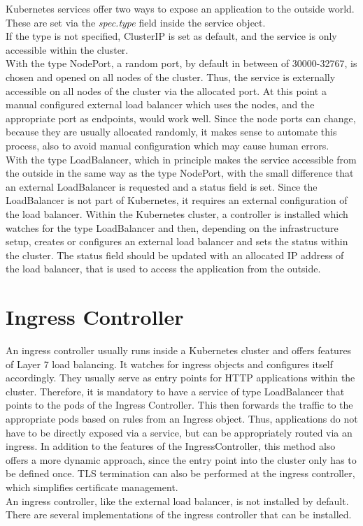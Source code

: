 Kubernetes services offer two ways to expose an application to the outside world.
These are set via the \textit{spec.type} field inside the service object.
\\
If the type is not specified, ClusterIP is set as default, and the service is only accessible within the cluster.
\\
With the type NodePort, a random port, by default in between of 30000-32767, is chosen and opened on all nodes of the cluster.
Thus, the service is externally accessible on all nodes of the cluster via the allocated port.
At this point a manual configured external load balancer which uses the nodes, and the appropriate port as endpoints, would work well.
Since the node ports can change, because they are usually allocated randomly, it makes sense to automate this process, also to avoid manual configuration which may cause human errors.
\\
With the type LoadBalancer, which in principle makes the service accessible from the outside in the same way as the type NodePort, with the small difference that an external LoadBalancer is requested and a status field is set.
Since the LoadBalancer is not part of Kubernetes, it requires an external configuration of the load balancer.
Within the Kubernetes cluster, a controller is installed which watches for the type LoadBalancer and then, depending on the infrastructure setup, creates or configures an external load balancer and sets the status within the cluster.
The status field should be updated with an allocated IP address of the load balancer, that is used to access the application from the outside.~\cite{KUBERNETES-SERVICE}

\section{Ingress Controller}\label{sec:IngressController}

An ingress controller usually runs inside a Kubernetes cluster and offers features of Layer 7 load balancing.
It watches for ingress objects and configures itself accordingly.
They usually serve as entry points for HTTP applications within the cluster.
Therefore, it is mandatory to have a service of type LoadBalancer that points to the pods of the Ingress Controller.
This then forwards the traffic to the appropriate pods based on rules from an Ingress object.
Thus, applications do not have to be directly exposed via a service, but can be appropriately routed via an ingress.
In addition to the features of the IngressController, this method also offers a more dynamic approach, since the entry point into the cluster only has to be defined once.
TLS termination can also be performed at the ingress controller, which simplifies certificate management.~\cite{KUBERNETES-INGRESS}
\\
An ingress controller, like the external load balancer, is not installed by default.
There are several implementations of the ingress controller that can be installed.~\cite{KUBERNETES-INGRESS-CONTROLLER}

